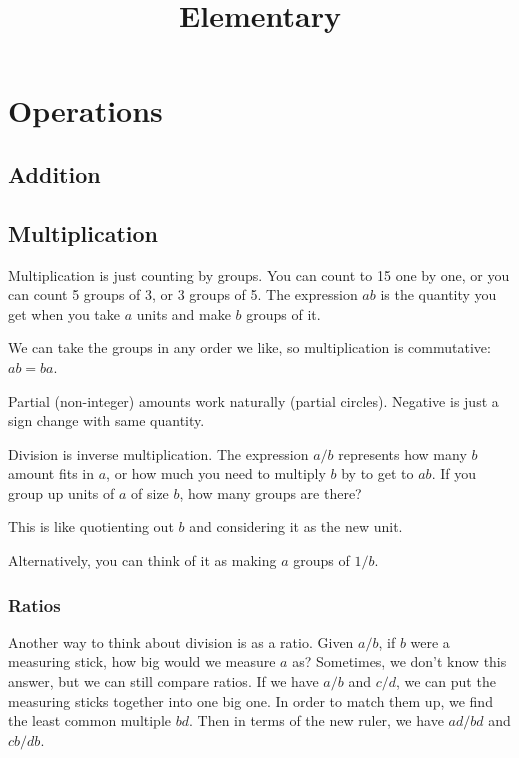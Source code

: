 \documentclass[../main.tex]{subfiles}
\title{Elementary}
\author{}
\date{}
\begin{document}
\maketitle
\tableofcontents

\newpage

\section{Operations}

\subsection{Addition}

\subsection{Multiplication}

Multiplication is just counting by groups.
You can count to 15 one by one, or you can count 5 groups of 3, or 3 groups of 5.
The expression \( ab \)
is the quantity you get when you take \( a \) units and make \( b \) groups of it.



We can take the groups in any order we like, so multiplication is commutative:
\( ab = ba \).



Partial (non-integer) amounts work naturally (partial circles).
Negative is just a sign change with same quantity.

Division is inverse multiplication.
The expression \( a/b \) represents how many \( b \) amount fits in \( a \),
or how much you need to multiply \( b \) by to get to \( ab \).
If you group up units of \( a \) of size \( b \), how many groups are there?



This is like quotienting out \( b \) and considering it as the new unit.

Alternatively, you can think of it as making \( a \) groups of \( 1/b \).


\subsubsection{Ratios}

Another way to think about division is as a ratio.
Given \( a/b \), if \( b \) were a measuring stick, how big would we measure \( a \) as?
Sometimes, we don't know this answer, but we can still compare ratios.
If we have \( a/b \) and \( c/d \), we can put the measuring sticks together into one big one.
In order to match them up, we find the least common multiple \( bd \).
Then in terms of the new ruler, we have \( ad/bd \) and \( cb/db \).
\end{document}
